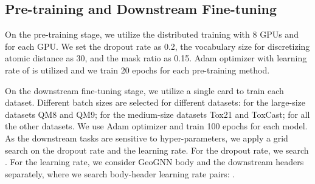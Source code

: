 \documentclass{article}
\begin{document}
\subsection{Pre-training and Downstream Fine-tuning}


On the pre-training stage, we utilize the distributed training with 8 GPUs and  for each GPU. We set the dropout rate as 0.2, the vocabulary size for discretizing atomic distance as 30, and the mask ratio as 0.15. Adam optimizer \cite{DBLP:journals/corr/KingmaB14} with learning rate of  is utilized and we train 20 epochs for each pre-training method.

On the downstream fine-tuning stage, we utilize a single card to train each dataset. Different batch sizes are selected for different datasets:  for the large-size datasets QM8 and QM9;  for the medium-size datasets Tox21 and ToxCast;  for all the other datasets. We use Adam optimizer and train 100 epochs for each model. As the downstream tasks are sensitive to hyper-parameters, we apply a grid search on the dropout rate and the learning rate. For the dropout rate, we search . For the learning rate, we consider GeoGNN body and the downstream headers separately, where we search body-header learning rate pairs: .


\newpage
\small


\end{document}
